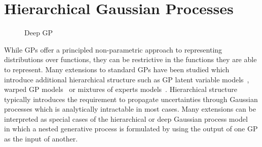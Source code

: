 \section{Hierarchical Gaussian Processes}
\label{toc:dgp}
\begin{figure}[t]
    \centering
    \caption{
        Deep GP
        \label{fig:dgp:graphical_model}
    }
\end{figure}
While GPs offer a principled non-parametric approach to representing distributions over functions, they can be restrictive in the functions they are able to represent.
Many extensions to standard GPs have been studied which introduce additional hierarchical structure such as GP latent variable models~\parencite{titsias_bayesian_2010,damianou_variational_2014}, warped GP models~\parencite{snelson_warped_2004,lazaro-gredilla_bayesian_2012} or mixtures of experts models~\parencite{tresp_mixtures_2001,rasmussen_infinite_2002,lazaro-gredilla_overlapping_2012}.
Hierarchical structure typically introduces the requirement to propagate uncertainties through Gaussian processes which is analytically intractable in most cases.
Many extensions can be interpreted as special cases of the hierarchical or deep Gaussian process model~\parencite{lawrence_hierarchical_2007,damianou_deep_2013} in which a nested generative process is formulated by using the output of one GP as the input of another.

